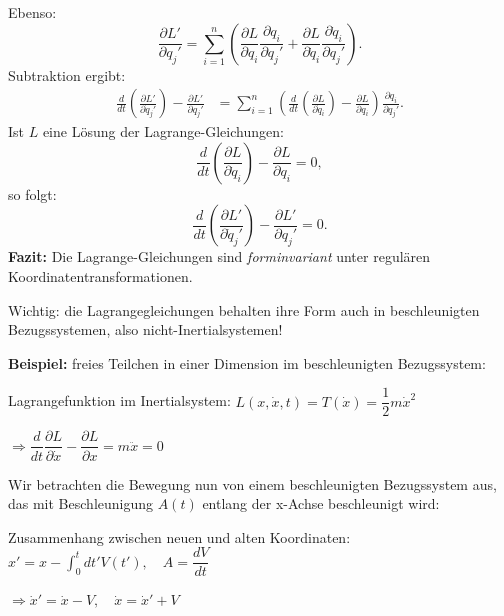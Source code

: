 \documentclass[10pt, letterpaper]{article}
\begin{document}
Ebenso:
\[
\frac{\partial L'}{\partial q_j'} 
= \sum_{i=1}^n \left( 
  \frac{\partial L}{\partial q_i} \frac{\partial q_i}{\partial q_j'} 
+ \frac{\partial L}{\partial \dot{q}_i} \frac{\partial \dot{q}_i}{\partial q_j'} 
\right).
\]
Subtraktion ergibt:
\begin{align*}
\frac{d}{dt} \left( \frac{\partial L'}{\partial \dot{q}_j'} \right) - \frac{\partial L'}{\partial q_j'}
&= \sum_{i=1}^n \left( 
  \frac{d}{dt} \left( \frac{\partial L}{\partial \dot{q}_i} \right) 
  - \frac{\partial L}{\partial q_i} \right) \frac{\partial q_i}{\partial q_j'}.
\end{align*}
Ist \( L \) eine Lösung der Lagrange-Gleichungen:
\[
\frac{d}{dt} \left( \frac{\partial L}{\partial \dot{q}_i} \right) - \frac{\partial L}{\partial q_i} = 0,
\]
so folgt:
\[
\frac{d}{dt} \left( \frac{\partial L'}{\partial \dot{q}_j'} \right) - \frac{\partial L'}{\partial q_j'} = 0.
\]
\textbf{Fazit:}  
Die Lagrange-Gleichungen sind \emph{forminvariant} unter regulären Koordinatentransformationen.

Wichtig: die Lagrangegleichungen behalten ihre Form auch in beschleunigten Bezugssystemen, also nicht-Inertialsystemen!




\textbf{Beispiel:} freies Teilchen in einer Dimension im beschleunigten Bezugssystem:


Lagrangefunktion im Inertialsystem:
$L(x,\dot{x},t) = T(\dot{x}) = \dfrac{1}{2}m\dot{x}^2$

$\Rightarrow \dfrac{d}{dt}\dfrac{\partial L}{\partial \dot{x}} - \dfrac{\partial L}{\partial x} = m\ddot{x} = 0$

Wir betrachten die Bewegung nun von einem beschleunigten Bezugssystem aus, das mit Beschleunigung $A(t)$ entlang der x-Achse beschleunigt wird:


Zusammenhang zwischen neuen und alten Koordinaten:
$x' = x - \int_0^t dt' V(t'), \quad A = \dfrac{dV}{dt}$

$\Rightarrow \dot{x}' = \dot{x} - V, \quad \dot{x} = \dot{x}' + V$
\end{document}
